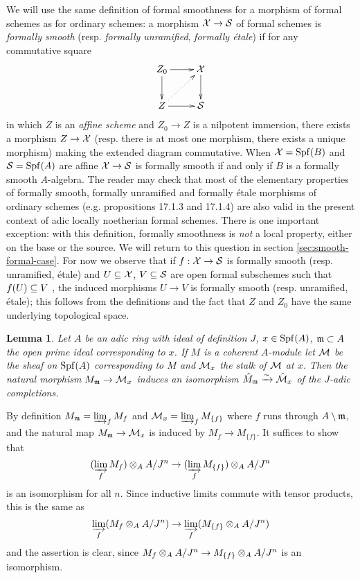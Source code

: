 \documentclass{article}
\theoremstyle{change}
\newtheorem{lemma}[subsubsection]{Lemma}
\numberwithin{equation}{subsubsection}
\newcommand{\demobox}{\vrule height6pt width6pt depth0pt}
\newenvironment{demo}{\noindent{\it Proof.}}
{{\unskip\nobreak\hfil\qquad
\demobox\parfillskip=0pt\par}
\medskip}
\begin{document}
We will use the same definition of formal smoothness for a morphism of
formal schemes as for ordinary schemes: a morphism ${\cal X}\to{\cal S}$ of
formal schemes is \textit{formally smooth} (resp. \textit{formally
  unramified}, \textit{formally \'etale}) if for any commutative
square
\begin{displaymath}
  \xymatrix{
    Z_0\ar[r]\ar[d]&\cX\ar[d]\\
    Z\ar[r]\ar@{.>}[ur]&\cS
  }  
\end{displaymath}
in which $Z$ is an \textit{affine scheme} and $Z_0\to Z$ is a
nilpotent immersion, there exists a morphism $Z\to{\cal X}$ (resp. there is
at most one morphism, there exists a unique morphism) making the
extended diagram commutative. When ${\cal X}={\operatorname{Spf}({B})}$ and ${\cal S}={\operatorname{Spf}({A})}$ are
affine ${\cal X}\to{\cal S}$ is formally smooth if and only if $B$ is a formally
smooth $A$-algebra. The reader may check that most of the elementary
properties of formally smooth, formally unramified and formally
\'etale morphisms of ordinary schemes (e.g. \cite[IV \S17]{EGA}
propositions 17.1.3 and 17.1.4) are also valid in the present context
of adic locally noetherian formal schemes. There is one important
exception: with this definition, formally smoothness is \textit{not} a
local property, either on the base or the source. We will return to
this question in section \ref{sec:smooth-formal-case}.  For now we
observe that if $f:{\cal X}\to{\cal S}$ is formally smooth (resp. unramified,
\'etale) and $U\subseteq{\cal X}$, $V\subseteq{\cal S}$ are open formal subschemes such
that $f(U)\subseteq V$ , the induced morphisms $U\to V$ is formally smooth
(resp. unramified, \'etale); this follows from the definitions and the
fact that $Z$ and $Z_0$ have the same underlying topological space.

\begin{lemma}\label{lemma:completions-of-local-rings}
  Let $A$ be an adic ring with ideal of definition $J$, $x\in{\operatorname{Spf}({A})}$,
  ${\mathfrak m}\subset A$ the open prime ideal corresponding to $x$. If $M$ is
  a coherent $A$-module let ${\cal M}$ be the sheaf on ${\operatorname{Spf}({A})}$
  corresponding to $M$ and ${\cal M}_x$ the stalk of ${\cal M}$ at $x$. Then the
  natural morphism $M_{\mathfrak m}\to{\cal M}_x$ induces an isomorphism
  $\hat M_{\mathfrak m}\xrightarrow{\sim}\hat{{\cal M}}_x$ of the $J$-adic completions.
\end{lemma}
\begin{demo}
  By definition $M_{\mathfrak m}=\varinjlim_fM_f$ and ${\cal M}_x=\varinjlim_fM_{\{f\}}$
  where $f$ runs through $A\setminus{\mathfrak m}$, and the natural map
  $M_{\mathfrak m}\to{\cal M}_x$ is induced by $M_f\to M_{\{f\}}$. It suffices to
  show that
  \begin{displaymath}
    (\varinjlim_fM_f)\otimes_AA/J^n\to(\varinjlim_fM_{\{f\}})\otimes_AA/J^n
  \end{displaymath}
  is an isomorphism for all $n$. Since inductive limits commute with
  tensor products, this is the same as
  \begin{displaymath}
    \varinjlim_f(M_f\otimes_AA/J^n)\to\varinjlim_f(M_{\{f\}}\otimes_AA/J^n)
  \end{displaymath}
  and the assertion is clear, since
  $M_f\otimes_AA/J^n\to M_{\{f\}}\otimes_AA/J^n$ is an isomorphism.
\end{demo}
\end{document}
